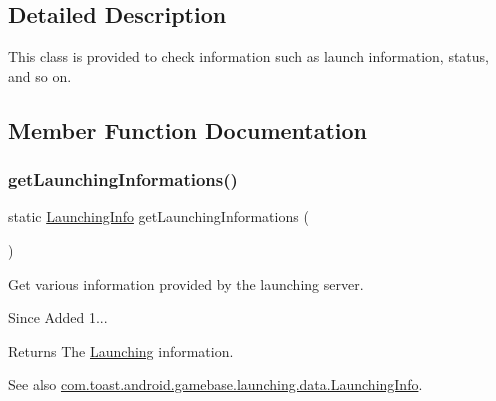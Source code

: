 \subsection{Detailed Description}
This class is provided to check information such as launch information, status, and so on. 

\subsection{Member Function Documentation}
\mbox{\label{classcom_1_1toast_1_1android_1_1gamebase_1_1_gamebase_1_1_launching_a93ab4a06b72866dace784957cbf218c0}} 
\subsubsection{\texorpdfstring{get\+Launching\+Informations()}{getLaunchingInformations()}}
{\footnotesize\ttfamily static \hyperlink{classcom_1_1toast_1_1android_1_1gamebase_1_1launching_1_1data_1_1_launching_info}{Launching\+Info} get\+Launching\+Informations (\begin{DoxyParamCaption}{ }\end{DoxyParamCaption})\hspace{0.3cm}{\ttfamily [static]}}



Get various information provided by the launching server. 

\begin{DoxySince}{Since}
Added 1... 
\end{DoxySince}
\begin{DoxyReturn}{Returns}
The \hyperlink{classcom_1_1toast_1_1android_1_1gamebase_1_1_gamebase_1_1_launching}{Launching} information. 
\end{DoxyReturn}
\begin{DoxySeeAlso}{See also}
\hyperlink{classcom_1_1toast_1_1android_1_1gamebase_1_1launching_1_1data_1_1_launching_info}{com.\+toast.\+android.\+gamebase.\+launching.\+data.\+Launching\+Info}. 
\end{DoxySeeAlso}
\mbox{\label{classcom_1_1toast_1_1android_1_1gamebase_1_1_gamebase_1_1_launching_a279d78644ff42918857fcb056a38ff49}} 
